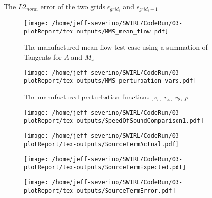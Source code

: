 \documentclass[a4paper]{article}
\begin{document}
\begin{align}
     
\end{align}



\begin{align}
     
\end{align}




The $L2_{norm}$ error of the two grids 
$\epsilon_{grid_i}$ and $\epsilon_{grid_i+1}$
\begin{figure}[!]
    \centering
    \texttt{[image: /home/jeff-severino/SWIRL/CodeRun/03-plotReport/tex-outputs/MMS\_mean\_flow.pdf]}
    \caption{The manufactured mean flow test case using a summation of Tangents for $A$ and $M_x$}
    \label{fig:1}
\end{figure}

\begin{figure}[!]
    \centering
    \texttt{[image: /home/jeff-severino/SWIRL/CodeRun/03-plotReport/tex-outputs/MMS\_perturbation\_vars.pdf]}
    \caption{The manufactured perturbation functions ,$v_r$, $v_x$, $v_{\theta}$, $p$}
    \label{fig:1a}
\end{figure}

\begin{figure}[!]
    \centering
    \texttt{[image: /home/jeff-severino/SWIRL/CodeRun/03-plotReport/tex-outputs/SpeedOfSoundComparison1.pdf]}
    \caption{}
    \label{fig:2}
\end{figure}



\begin{figure}[!]
    \centering
    \texttt{[image: /home/jeff-severino/SWIRL/CodeRun/03-plotReport/tex-outputs/SourceTermActual.pdf]}
    \caption{}
    \label{fig:3}
\end{figure}


\begin{figure}[!]
    \centering
    \texttt{[image: /home/jeff-severino/SWIRL/CodeRun/03-plotReport/tex-outputs/SourceTermExpected.pdf]}
    \caption{}
    \label{fig:3}
\end{figure}


\begin{figure}[!]
    \centering
    \texttt{[image: /home/jeff-severino/SWIRL/CodeRun/03-plotReport/tex-outputs/SourceTermError.pdf]}
    \caption{}
    \label{fig:3}
\end{figure}
\end{document}
